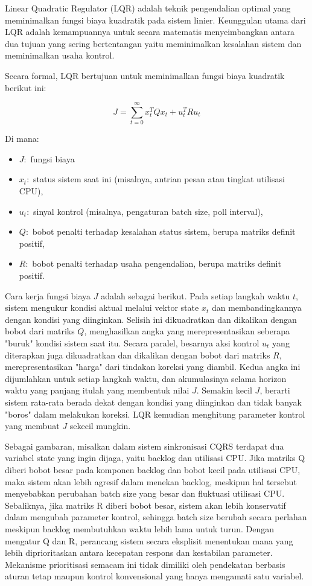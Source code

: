 Linear Quadratic Regulator (LQR) adalah teknik pengendalian optimal yang meminimalkan fungsi biaya kuadratik pada sistem linier.
Keunggulan utama dari LQR adalah kemampuannya untuk secara matematis menyeimbangkan antara dua tujuan yang sering bertentangan yaitu meminimalkan kesalahan sistem dan meminimalkan usaha kontrol.

Secara formal, LQR bertujuan untuk meminimalkan fungsi biaya kuadratik berikut ini:

\begin{equation}
J = \sum_{t = 0}^{\infty}{x_{t}^{T}Qx_{t} + u_{t}^{T}Ru_{t}}
\label{eq:cost-lqr}
\end{equation}

Di mana:

\begin{itemize}
\item \(J:\) fungsi biaya
\item \(x_{t}:\) status sistem saat ini (misalnya, antrian pesan atau tingkat utilisasi CPU),
\item \(u_{t}:\) sinyal kontrol (misalnya, pengaturan batch size, poll interval),
\item \(Q:\) bobot penalti terhadap kesalahan status sistem, berupa matriks definit positif,
\item \(R:\) bobot penalti terhadap usaha pengendalian, berupa matriks definit positif.
\end{itemize}

Cara kerja fungsi biaya $J$ adalah sebagai berikut.
Pada setiap langkah waktu $t$, sistem mengukur kondisi aktual melalui vektor state $x_t$ dan membandingkannya dengan kondisi yang diinginkan.
Selisih ini dikuadratkan dan dikalikan dengan bobot dari matriks $Q$, menghasilkan angka yang merepresentasikan seberapa "buruk" kondisi sistem saat itu.
Secara paralel, besarnya aksi kontrol $u_t$ yang diterapkan juga dikuadratkan dan dikalikan dengan bobot dari matriks $R$, merepresentasikan "harga" dari tindakan koreksi yang diambil.
Kedua angka ini dijumlahkan untuk setiap langkah waktu, dan akumulasinya selama horizon waktu yang panjang itulah yang membentuk nilai $J$.
Semakin kecil $J$, berarti sistem rata-rata berada dekat dengan kondisi yang diinginkan dan tidak banyak "boros" dalam melakukan koreksi.
LQR kemudian menghitung parameter kontrol yang membuat $J$ sekecil mungkin.

Sebagai gambaran, misalkan dalam sistem sinkronisasi CQRS terdapat dua variabel state yang ingin dijaga, yaitu backlog dan utilisasi CPU.
Jika matriks Q diberi bobot besar pada komponen backlog dan bobot kecil pada utilisasi CPU, maka sistem akan lebih agresif dalam menekan backlog, meskipun hal tersebut menyebabkan perubahan batch size yang besar dan fluktuasi utilisasi CPU.
Sebaliknya, jika matriks R diberi bobot besar, sistem akan lebih konservatif dalam mengubah parameter kontrol, sehingga batch size berubah secara perlahan meskipun backlog membutuhkan waktu lebih lama untuk turun.
Dengan mengatur Q dan R, perancang sistem secara eksplisit menentukan mana yang lebih diprioritaskan antara kecepatan respons dan kestabilan parameter.
Mekanisme prioritisasi semacam ini tidak dimiliki oleh pendekatan berbasis aturan tetap maupun kontrol konvensional yang hanya mengamati satu variabel.

